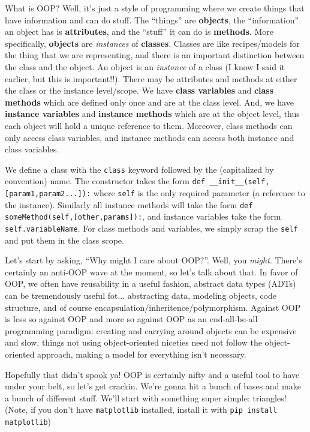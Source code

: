 \documentclass[12pt, twoside, reqno]{book}
\begin{document}
What is OOP? Well, it's just a style of programming where we create things that have information and can do stuff. The ``things'' are \textbf{objects}, the ``information'' an object has is \textbf{attributes}, and the ``stuff'' it can do is \textbf{methods}. More specifically, \textbf{objects} are \textit{instances} of \textbf{classes}. Classes are like recipes/models for the thing that we are representing, and there is an important distinction between the class and the object. An object is an \textit{instance} of a class (I know I said it earlier, but this is important!!). There may be attributes and methods at either the class or the instance level/scope. We have \textbf{class variables} and \textbf{class methods} which are defined only once and are at the class level. And, we have \textbf{instance variables} and \textbf{instance methods} which are at the object level, thus each object will hold a unique reference to them. Moreover, class methods can only access class variables, and instance methods can access both instance and class variables.

We define a class with the \texttt{class} keyword followed by the (capitalized by convention) name. The constructor takes the form \texttt{def \_\_init\_\_(self,[param1,param2...]):} where \texttt{self} is the only required parameter (a reference to the instance). Similarly all instance methods will take the form \texttt{def someMethod(self,[other,params]):}, and instance variables take the form \texttt{self.variableName}. For class methods and variables, we simply scrap the \texttt{self} and put them in the class scope.

Let's start by asking, ``Why might I care about OOP?''. Well, you \textit{might}. There's certainly an anti-OOP wave at the moment, so let's talk about that. In favor of OOP, we often have reusability in a useful fashion, abstract data types (ADTs) can be tremendously useful fot... abstracting data, modeling objects, code structure, and of course encapsulation/inheritence/polymorphism. Against OOP is less so against OOP and more so against OOP as an end-all-be-all programming paradigm: creating and carrying around objects can be expensive and slow, things not using object-oriented niceties need not follow the object-oriented approach, making a model for everything isn't necessary.

Hopefully that didn't spook ya! OOP is certainly nifty and a useful tool to have under your belt, so let's get crackin. We're gonna hit a bunch of bases and make a bunch of different stuff. We'll start with something super simple: triangles! (Note, if you don't have \texttt{matplotlib} installed, install it with \texttt{pip install matplotlib})
\end{document}
